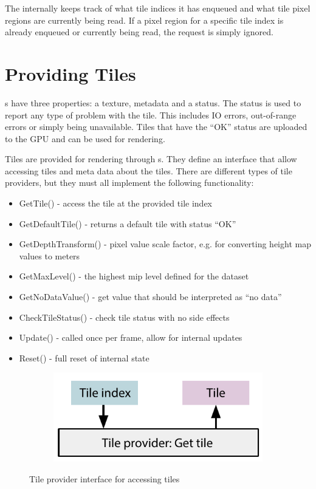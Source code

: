 The  internally keeps track of what tile indices it has enqueued and what tile pixel regions are currently being read. If a pixel region for a specific tile index is already enqueued or currently being read, the request is simply ignored. 


\section{Providing Tiles}
s have three properties: a texture, metadata and a status. The status is used to report any type of problem with the tile. This includes IO errors, out-of-range errors or simply being unavailable. Tiles that have the ``OK'' status are uploaded to the GPU and can be used for rendering. 

Tiles are provided for rendering through s. They define an interface that allow accessing tiles and meta data about the tiles. There are different types of tile providers, but they must all implement the following functionality:

\begin{itemize}
\item GetTile() - access the tile at the provided tile index
\item GetDefaultTile() - returns a default tile with status ``OK''
\item GetDepthTransform() - pixel value scale factor, e.g. for converting height map values to meters
\item GetMaxLevel() - the highest mip level defined for the dataset
\item GetNoDataValue() - get value that should be interpreted as ``no data''
\item CheckTileStatus() - check tile status with no side effects
\item Update() - called once per frame, allow for internal updates
\item Reset() - full reset of internal state
\end{itemize}

\begin{figure}[htbp]
    \centering
    \begin{subfigure}[bt]{0.4\textwidth}
        \includegraphics[width=\textwidth]{figures/implementation/tileprovider/tileprovider_gettile.pdf}
    \end{subfigure}
    \caption{Tile provider interface for accessing tiles}
    \label{fig:tileprovider}
\end{figure}

